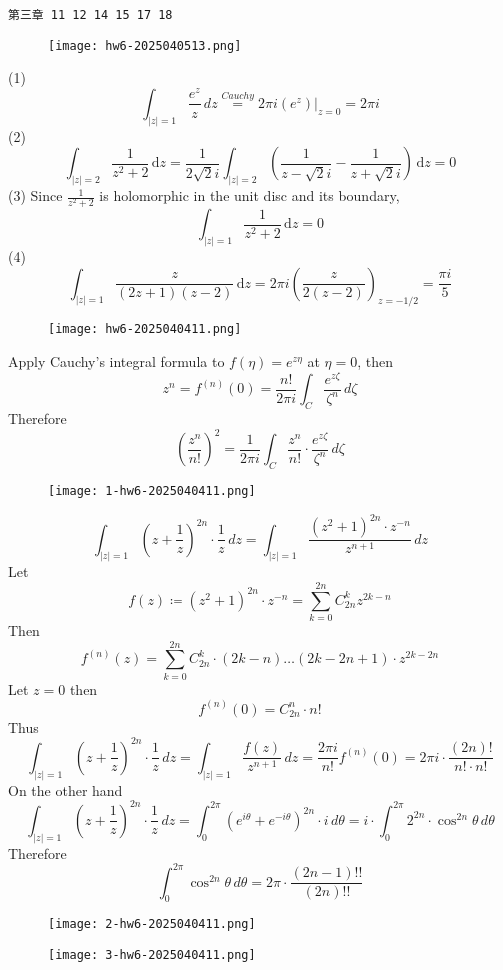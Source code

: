 \begin{lstlisting}
第三章 11 12 14 15 17 18
\end{lstlisting}
\begin{figure}[H]
\centering
\texttt{[image: hw6-2025040513.png]}
\label{}
\end{figure}

(1)
\[
\int_{\lvert z \rvert =1}^{} \frac{e^{ z }}{z} \, dz \overset{ Cauchy }{ = }2\pi i\left.(e^{ z })\right|_{z=0}=2\pi i
\]
(2)
\[
\int_{\lvert z \rvert =2}^{} \frac{1}{z^2+2}  \, \mathrm{d}z =\frac{1}{2\sqrt{ 2 }i} \int_{\lvert z \rvert =2}^{}\left(  \frac{1}{z-\sqrt{ 2 }i} -\frac{1}{z+\sqrt{ 2 }i} \right)  \, \mathrm{d}z =0
\]
(3)
Since $\frac{1}{z^2+2}$ is holomorphic in the unit disc and its boundary,
\[
\int_{\lvert z \rvert =1}^{} \frac{1}{z^2+2}  \, \mathrm{d}z= 0
\]
(4)
\[
\int_{\lvert z \rvert =1}^{} \frac{z}{(2z+1)(z-2)} \, \mathrm{d}z=2\pi i\left( \frac{z}{2(z-2)}  \right)_{z=-1/2 }=\frac{\pi i}{5}
\]
\begin{figure}[H]
\centering
\texttt{[image: hw6-2025040411.png]}
\label{}
\end{figure}

Apply Cauchy's integral formula to $f(\eta)=e^{ z \eta }$ at $\eta=0$, then
\[
z^{n}=f^{(n)}(0)=\frac{n!}{2\pi i}\int_{C}^{} \frac{e^{ z \zeta }}{\zeta^{n}} \, d\zeta 
\]
Therefore
\[
\left( \frac{z^{n}}{n!} \right)^{2}=\frac{1}{2\pi i}\int_{C}^{} \frac{z^{n}}{n!}\cdot\frac{e^{ z\zeta }}{\zeta^{n}} \, d\zeta
\]
\begin{figure}[H]
\centering
\texttt{[image: 1-hw6-2025040411.png]}
\label{}
\end{figure}
\[
\int_{\lvert z \rvert =1}^{} \left( z+\frac{1}{z} \right)^{2n}\cdot\frac{1}{z}  \, dz   =\int_{\lvert z \rvert=1 }^{} \frac{(z^2+1)^{2n}\cdot z^{-n}}{z^{n+1}} \, dz 
\]
Let
\[
f(z)\coloneqq (z^2+1)^{2n}\cdot z^{-n}=\sum_{k=0}^{2n} C^{k}_{2n}z^{2k-n}
\]
Then
\[
f^{(n)}(z)=\sum_{k=0}^{2n} C^{k}_{2n}\cdot(2k-n)\dots(2k-2n+1)\cdot z^{2k-2n}
\]
Let $z=0$ then
\[
f^{(n)}(0)=C^{n}_{2n}\cdot n!
\]
Thus
\[
\int_{\lvert z \rvert =1}^{} \left( z+\frac{1}{z} \right)^{2n}\cdot\frac{1}{z} \, dz=\int_{\lvert z \rvert =1}^{} \frac{f(z)}{z^{n+1}} \, dz=  \frac{2\pi i}{n!}f^{(n)}(0)=2\pi i\cdot\frac{(2n)!}{n!\cdot n!}
\]
On the other hand
\[
\int_{\lvert z \rvert =1}^{} \left( z+\frac{1}{z} \right)^{2n}\cdot\frac{1}{z} \, dz=\int_{0}^{2\pi} (e^{ i\theta }+e^{ -i\theta })^{2n}\cdot i \, d\theta=i\cdot\int_{0}^{2\pi} 2^{2n}\cdot \cos ^{2n}\theta \, d\theta
\]
Therefore
\[
\int_{0}^{2\pi} \cos ^{2n}\theta \, d\theta=2\pi \cdot\frac{(2n-1)!!}{(2n)!!}
\]
\begin{figure}[H]
\centering
\texttt{[image: 2-hw6-2025040411.png]}
\label{}
\end{figure}
\begin{figure}[H]
\centering
\texttt{[image: 3-hw6-2025040411.png]}
\label{}
\end{figure}

